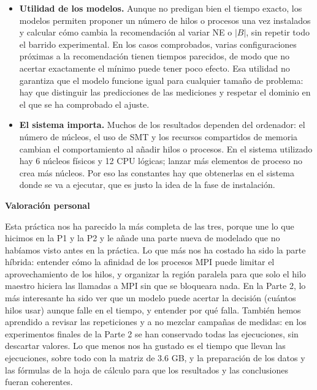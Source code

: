 \documentclass[12pt]{article}
\begin{document}
\begin{enumerate}
\begin{itemize}
    \item \textbf{Utilidad de los modelos.} Aunque no predigan bien el tiempo exacto, los modelos permiten proponer un número de hilos o procesos una vez instalados y calcular cómo cambia la recomendación al variar NE o $|B|$, sin repetir todo el barrido experimental. En los casos comprobados, varias configuraciones próximas a la recomendación tienen tiempos parecidos, de modo que no acertar exactamente el mínimo puede tener poco efecto. Esa utilidad no garantiza que el modelo funcione igual para cualquier tamaño de problema: hay que distinguir las predicciones de las mediciones y respetar el dominio en el que se ha comprobado el ajuste.
    \item \textbf{El sistema importa.} Muchos de los resultados dependen del ordenador: el número de núcleos, el uso de SMT y los recursos compartidos de memoria cambian el comportamiento al añadir hilos o procesos. En el sistema utilizado hay 6 núcleos físicos y 12 CPU lógicas; lanzar más elementos de proceso no crea más núcleos. Por eso las constantes hay que obtenerlas en el sistema donde se va a ejecutar, que es justo la idea de la fase de instalación.
\end{itemize}

\medskip
\noindent\textbf{Valoración personal}\par
\smallskip


Esta práctica nos ha parecido la más completa de las tres, porque une lo que hicimos en la P1 y la P2 y le añade una parte nueva de modelado que no habíamos visto antes en la práctica. Lo que más nos ha costado ha sido la parte híbrida: entender cómo la afinidad de los procesos MPI puede limitar el aprovechamiento de los hilos, y organizar la región paralela para que solo el hilo maestro hiciera las llamadas a MPI sin que se bloqueara nada. En la Parte 2, lo más interesante ha sido ver que un modelo puede acertar la decisión (cuántos hilos usar) aunque falle en el tiempo, y entender por qué falla. También hemos aprendido a revisar las repeticiones y a no mezclar campañas de medidas: en los experimentos finales de la Parte 2 se han conservado todas las ejecuciones, sin descartar valores. Lo que menos nos ha gustado es el tiempo que llevan las ejecuciones, sobre todo con la matriz de 3.6 GB, y la preparación de los datos y las fórmulas de la hoja de cálculo para que los resultados y las conclusiones fueran coherentes.

\end{enumerate}
\end{document}
